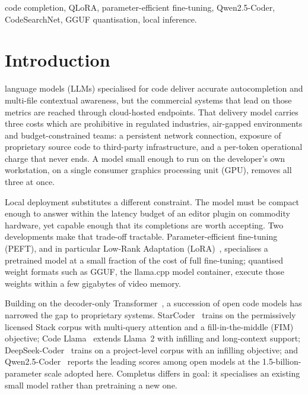 \documentclass[10pt,conference,a4paper]{IEEEtran}
\begin{document}
\begin{IEEEkeywords}
code completion, QLoRA, parameter-efficient fine-tuning, Qwen2.5-Coder,
CodeSearchNet, GGUF quantisation, local inference.
\end{IEEEkeywords}

\section{Introduction}
 language models (LLMs) specialised for code deliver
accurate autocompletion and multi-file contextual awareness, but the
commercial systems that lead on those metrics are reached through
cloud-hosted endpoints. That delivery model carries three costs which are
prohibitive in regulated industries, air-gapped environments and
budget-constrained teams: a persistent network connection, exposure of
proprietary source code to third-party infrastructure, and a per-token
operational charge that never ends. A model small enough to run on the
developer's own workstation, on a single consumer graphics processing unit
(GPU), removes all three at once.

Local deployment substitutes a different constraint. The model must be
compact enough to answer within the latency budget of an editor plugin on
commodity hardware, yet capable enough that its completions are worth
accepting. Two developments make that trade-off tractable. Parameter-efficient
fine-tuning (PEFT), and in particular Low-Rank Adaptation
(LoRA)~\cite{hu2022lora}, specialises a pretrained model at a small fraction
of the cost of full fine-tuning; quantised weight formats such as GGUF, the
llama.cpp model container, execute those weights within a few gigabytes of
video memory.

Building on the decoder-only Transformer~\cite{vaswani2017}, a succession of
open code models has narrowed the gap to proprietary systems.
StarCoder~\cite{li2023starcoder} trains on the permissively licensed Stack
corpus with multi-query attention and a fill-in-the-middle (FIM) objective;
Code Llama~\cite{roziere2023} extends Llama~2 with infilling and long-context
support; DeepSeek-Coder~\cite{guo2024} trains on a project-level corpus with
an infilling objective; and Qwen2.5-Coder~\cite{hui2024} reports the leading
scores among open models at the 1.5-billion-parameter scale adopted here.
Completus differs in goal: it specialises an existing small model rather
than pretraining a new one.
\end{document}
